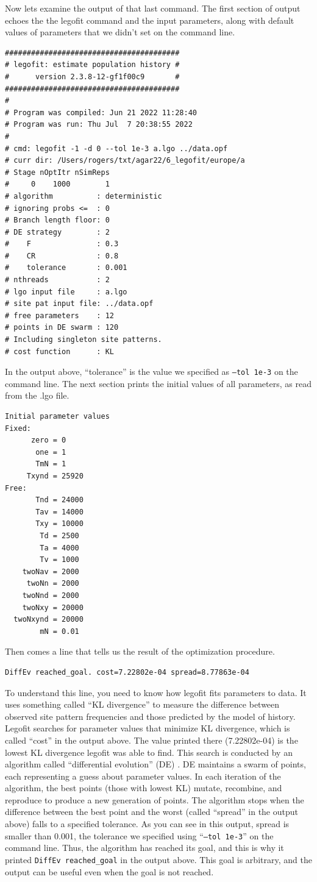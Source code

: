 \documentclass[11pt]{article}
\begin{document}
Now lets examine the output of that last command. The first section of output
echoes the the legofit command and the input parameters, along with
default values of parameters that we didn't set on the command line.
\begin{verbatim}
########################################
# legofit: estimate population history #
#      version 2.3.8-12-gf1f00c9       #
########################################
#
# Program was compiled: Jun 21 2022 11:28:40
# Program was run: Thu Jul  7 20:38:55 2022
#
# cmd: legofit -1 -d 0 --tol 1e-3 a.lgo ../data.opf
# curr dir: /Users/rogers/txt/agar22/6_legofit/europe/a
# Stage nOptItr nSimReps
#     0    1000        1
# algorithm          : deterministic
# ignoring probs <=  : 0
# Branch length floor: 0
# DE strategy        : 2
#    F               : 0.3
#    CR              : 0.8
#    tolerance       : 0.001
# nthreads           : 2
# lgo input file     : a.lgo
# site pat input file: ../data.opf
# free parameters    : 12
# points in DE swarm : 120
# Including singleton site patterns.
# cost function      : KL
\end{verbatim}
In the output above, ``tolerance'' is the value we specified as
\texttt{--tol 1e-3} on the command line.  The next section prints the
initial values of all parameters, as read from the .lgo file.
\begin{verbatim}
Initial parameter values
Fixed:
      zero = 0
       one = 1
       TmN = 1
     Txynd = 25920
Free:
       Tnd = 24000
       Tav = 14000
       Txy = 10000
        Td = 2500
        Ta = 4000
        Tv = 1000
    twoNav = 2000
     twoNn = 2000
    twoNnd = 2000
    twoNxy = 20000
  twoNxynd = 20000
        mN = 0.01
\end{verbatim}
Then comes a line that tells us the result of the optimization procedure.
\begin{verbatim}
DiffEv reached_goal. cost=7.22802e-04 spread=8.77863e-04
\end{verbatim}
To understand this line, you need to know how legofit fits parameters
to data. It uses something called ``KL divergence''
\citep{Kullback:AMS-22-79} to measure the difference between observed
site pattern frequencies and those predicted by the model of history.
Legofit searches for parameter values that minimize KL divergence,
which is called ``cost'' in the output above. The value printed there
(7.22802e-04) is the lowest KL divergence legofit was able to
find. This search is conducted by an algorithm called ``differential
evolution'' (DE) \citep{Price:DE-06}. DE maintains a swarm of points,
each representing a guess about parameter values.  In each iteration
of the algorithm, the best points (those with lowest KL) mutate,
recombine, and reproduce to produce a new generation of points. The
algorithm stops when the difference between the best point and the
worst (called ``spread'' in the output above) falls to a specified
tolerance. As you can see in this output, spread is smaller than
0.001, the tolerance we specified using ``\texttt{--tol 1e-3}'' on the
command line. Thus, the algorithm has reached its goal, and this is
why it printed \verb|DiffEv reached_goal| in the output above. This
goal is arbitrary, and the output can be useful even when the goal is
not reached.
\end{document}
